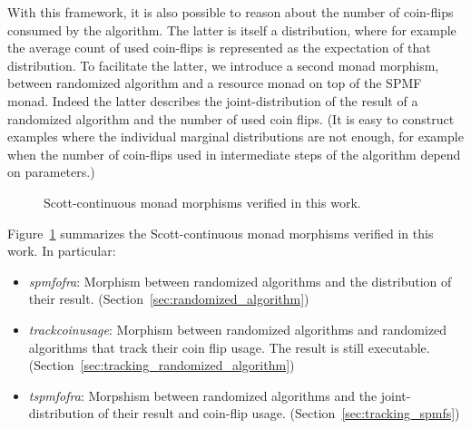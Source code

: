 \documentclass[11pt,a4paper]{article}
\begin{document}
With this framework, it is also possible to reason about the number of coin-flips consumed by the
algorithm. The latter is itself a distribution, where for example the average count of used
coin-flips is represented as the expectation of that distribution. To facilitate the latter, we
introduce a second monad morphism, between randomized algorithm and a resource monad on top of the
SPMF monad. Indeed the latter describes the joint-distribution of the result of a randomized
algorithm and the number of used coin flips. (It is easy to construct examples where the
individual marginal distributions are not enough, for example when the number of coin-flips used in
intermediate steps of the algorithm depend on parameters.)

\begin{figure}
\centering
{}
\caption{Scott-continuous monad morphisms verified in this work.}
\label{fig:morphisms}
\end{figure}

Figure~\ref{fig:morphisms} summarizes the Scott-continuous monad morphisms verified in this work.
In particular:

\begin{itemize}
\item \emph{spmf{\isacharunderscore}of{\isacharunderscore}ra}: Morphism between randomized
algorithms and the distribution of their result. (Section~\ref{sec:randomized_algorithm})
\item \emph{track{\isacharunderscore}coin{\isacharunderscore}usage}: Morphism between randomized algorithms and randomized algorithms
that track their coin flip usage. The result is still executable. (Section~\ref{sec:tracking_randomized_algorithm})
\item \emph{tspmf{\isacharunderscore}of{\isacharunderscore}ra}: Morpshism between randomized
algorithms and the joint-distribution of their result and coin-flip usage.
(Section~\ref{sec:tracking_spmfs})
\end{itemize}
\end{document}

